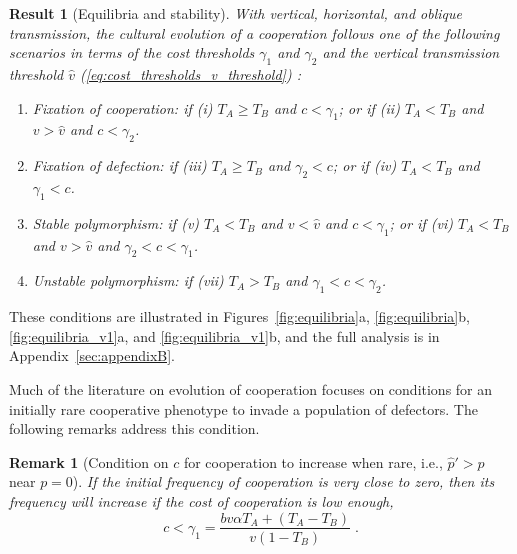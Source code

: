 \documentclass[12pt]{extarticle}
\newtheorem{remark}{Remark}
\newtheorem{result}{Result}
\begin{document}
\begin{result}[Equilibria and stability] \label{result:vert_obli_hori}
With vertical, horizontal, and oblique transmission, the cultural evolution of a cooperation follows one of the following scenarios in terms of the cost thresholds $\gamma_1$ and $\gamma_2$ and the vertical transmission threshold $\hat v$ (\autoref{eq:cost_thresholds_v_threshold}) :

\begin{enumerate}
\item \emph{Fixation of cooperation}: 
	if \emph{(i)} $T_A \ge T_B$ and $c < \gamma_1$; or 
	if \emph{(ii)} $T_A < T_B$ and $v>\hat v$ and $c < \gamma_2$.
\item \emph{Fixation of defection}: 
    if \emph{(iii)} $T_A \ge T_B$ and $\gamma_2 < c$; or 
	if \emph{(iv)} $T_A < T_B$ and $\gamma_1 < c$.
\item \emph{Stable polymorphism}: 
    if \emph{(v)} $T_A < T_B$ and $v<\hat{v}$ and $c < \gamma_1$; or 
    if \emph{(vi)} $T_A < T_B$ and $v>\hat{v}$ and $\gamma_2 < c < \gamma_1$.
\item \emph{Unstable polymorphism}:
    if \emph{(vii)} $T_A > T_B$ and $\gamma_1 < c < \gamma_2$.
\end{enumerate}

\end{result}
These conditions are illustrated in Figures~\ref{fig:equilibria}a, \ref{fig:equilibria}b, \ref{fig:equilibria_v1}a, and \ref{fig:equilibria_v1}b, and the full analysis is in Appendix~\ref{sec:appendixB}.

Much of the literature on evolution of cooperation focuses on conditions for  an initially rare cooperative phenotype to invade a population of defectors.
The following remarks address this condition.
\\

\begin{remark}[Condition on $c$ for cooperation to increase when rare, i.e., $\hat{p}'>p$ near $p=0$]
\label{remark:rarity}
If the initial frequency of cooperation is very close to zero, then its frequency will increase if the cost of cooperation is low enough,
\begin{equation} \label{eq:unequal_transmission_from_rarity_general_case}
c < \gamma_1 = \frac{b v \alpha T_A + (T_A - T_B)}{v(1-T_B)} \;.
\end{equation} 
\end{remark}
\end{document}
